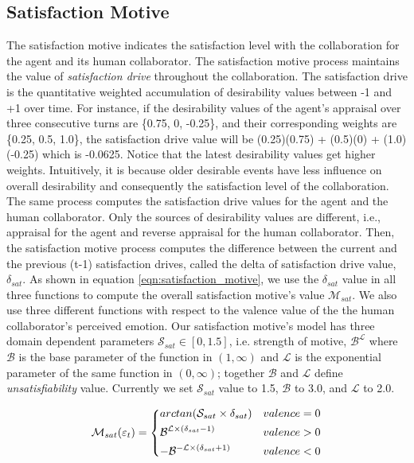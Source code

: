 \documentclass[12pt]{report}
\begin{document}
\subsection{Satisfaction Motive}
The satisfaction motive indicates the satisfaction level with the collaboration
for the agent and its human collaborator. The satisfaction motive process maintains
the value of \textit{satisfaction drive} throughout the collaboration. The
satisfaction drive is the quantitative weighted accumulation of desirability
values between -1 and +1 over time. For instance, if the desirability values of
the agent's appraisal over three consecutive turns are \{0.75, 0, -0.25\}, and
their corresponding weights are \{0.25, 0.5, 1.0\}, the satisfaction drive value
will be (0.25)(0.75) + (0.5)(0) + (1.0)(-0.25) which is -0.0625. Notice that
the latest desirability values get higher weights. Intuitively, it is because
older desirable events have less influence on overall desirability and
consequently the satisfaction level of the collaboration. The same process
computes the satisfaction drive values for the agent and the human collaborator.
Only the sources of desirability values are different, i.e., appraisal for the
agent and reverse appraisal for the human collaborator. Then, the satisfaction
motive process computes the difference between the current and the previous
(t-1) satisfaction drives, called the delta of satisfaction drive value,
$\delta_{sat}$. As shown in equation \ref{eqn:satisfaction_motive}, we use the
$\delta_{sat}$ value in all three functions to compute the overall satisfaction
motive's value $\mathcal{M}_{sat}$. We also use three different functions with
respect to the valence value of the the human collaborator's perceived emotion.
Our satisfaction motive's model has three domain dependent parameters
$\mathcal{S}_{sat} \in [0, 1.5]$, i.e. strength of motive,
$\mathcal{B}^\mathcal{L}$ where $\mathcal{B}$ is the base parameter of the
function in $(1,\infty)$ and $\mathcal{L}$ is the exponential parameter of the
same function in $(0, \infty)$; together $\mathcal{B}$ and $\mathcal{L}$ define
\textit{unsatisfiability} value. Currently we set $\mathcal{S}_{sat}$ value to
1.5, $\mathcal{B}$ to 3.0, and $\mathcal{L}$ to 2.0.

\begin{equation}
    \mathcal{M}_{sat}(\varepsilon_t)= 
    \begin{dcases}
       arctan (\mathcal{S}_{sat} \times \delta_{sat})      & valence = 0 \\
       \mathcal{B}^{\mathcal{L} \times (\delta_{sat}-1)}   & valence > 0 \\
       -\mathcal{B}^{-\mathcal{L} \times (\delta_{sat}+1)} & valence < 0
    \end{dcases}
    \label{eqn:satisfaction_motive}
\end{equation}
\end{document}

